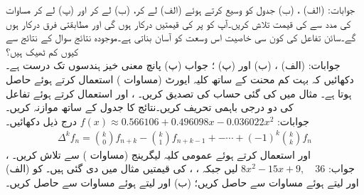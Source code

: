 جوابات:\quad
(الف) ، (ب) 
\quad
جدول  کو وسیع کرتے ہوئے  (الف)  لے کر، (ب)  لے کر اور (پ)  لے کر   مساوات  کی مدد سے  کی قیمت تلاش کریں۔آپ کو  پر  کی قیمتیں درکار ہوں گی اور مطابقتی فرق  درکار ہوں گے۔سائن تفاعل کی کون سی خاصیت اس وسعت کو آسان بناتی ہے۔موجودہ نتائج سوال  کے نتائج سے کیوں کم ٹھیک ہیں؟\\
جوابات:\quad
(الف) ، (ب)  اور (پ) ؛ جواب (پ) پانچ معنی خیز ہندسوں تک درست ہے۔ 
\quad
دکھائیں کہ بہت کم محنت کے ساتھ کلیہ ایورٹ (مساوات ) استعمال کرتے ہوئے  حاصل ہوتا ہے۔
\quad
مثال  میں کی گئی حساب کی تصدیق کریں۔
\quad
{}،  اور  استعمال کرتے ہوئے  تفاعل   کی دو درجی باہمی تحریف کریں۔نتائج کا جدول   کے ساتھ موازنہ کریں۔ \\
جوابات:\quad
$f(x)\approx \num{0.566106}+\num{0.496098}x-\num{0.036022}x^2$
\quad
درج ذیل دکھائیں۔
\begin{align*}
\Delta^k f_n=\binom{k}{0}f_{n+k}-\binom{k}{1}f_{n+k-1}+-\cdots+(-1)^k\binom{k}{k}f_n
\end{align*}
\quad
{}،  اور  استعمال کرتے ہوئے 
عمومی کلیہ لیگرینج (مساوات ) سے   تلاش کریں۔ \\
جواب:\quad
$8x^2-15x+9,\quad 36$
\quad
{} لیں جبکہ ، ،  کی قیمتیں مثال  میں دی گئی ہیں۔  کو (الف)   اور  لیتے ہوئے مساوات   سے حاصل کریں؛ (ب)  اور  لیتے ہوئے مساوات  سے حاصل کریں۔
